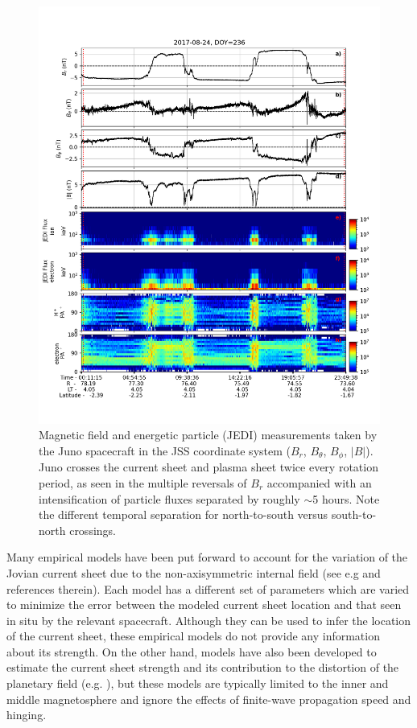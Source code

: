 \begin{figure}
    \centering
    \includegraphics[height=0.8\textheight]{images5/Juno-currentsheet-magjedi.png}
    \caption{Magnetic field and energetic particle (JEDI) measurements taken by the Juno spacecraft in the JSS coordinate system ($B_r$, $B_\theta$, $B_\phi$, $|B|$). Juno crosses the current sheet and plasma sheet twice every rotation period, as seen in the multiple reversals of $B_r$ accompanied with an intensification of particle fluxes separated by roughly $\sim$5 hours. Note the different temporal separation for north-to-south versus south-to-north crossings.}
    \label{fig:juno-current-sheet}
\end{figure}

Many empirical models have been put forward to account for the variation of the Jovian current sheet due to the non-axisymmetric internal field (see e.g  and references therein). Each model has a different set of parameters which are varied to minimize the error between the modeled current sheet location and that seen in situ by the relevant spacecraft. Although they can be used to infer the location of the current sheet, these empirical models do not provide any information about its strength. On the other hand, models have also been developed to estimate the current sheet strength and its contribution to the distortion of the planetary field (e.g. ), but these models are typically limited to the inner and middle magnetosphere and ignore the effects of finite-wave propagation speed and hinging.


